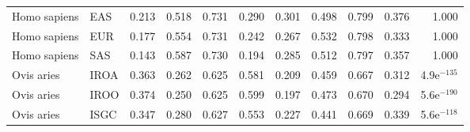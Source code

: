 \begin{center}
\begin{adjustbox}{width = 1\textwidth}
\begin{tabular}{llrrrrrrrrr}
        Homo sapiens &                       EAS &                              0.213 &                               0.518 &                 0.731 &                 0.290 &                              0.301 &                               0.498 &                 0.799 &                 0.376 &         1.000 \\
        Homo sapiens &                       EUR &                              0.177 &                               0.554 &                 0.731 &                 0.242 &                              0.267 &                               0.532 &                 0.798 &                 0.333 &         1.000 \\
        Homo sapiens &                       SAS &                              0.143 &                               0.587 &                 0.730 &                 0.194 &                              0.285 &                               0.512 &                 0.797 &                 0.357 &         1.000 \\
          Ovis aries &                      IROA &                              0.363 &                               0.262 &                 0.625 &                 0.581 &                              0.209 &                               0.459 &                 0.667 &                 0.312 & 4.9e$^{-135}$ \\
          Ovis aries &                      IROO &                              0.374 &                               0.250 &                 0.625 &                 0.599 &                              0.197 &                               0.473 &                 0.670 &                 0.294 & 5.6e$^{-190}$ \\
          Ovis aries &                      ISGC &                              0.347 &                               0.280 &                 0.627 &                 0.553 &                              0.227 &                               0.441 &                 0.669 &                 0.339 & 5.6e$^{-118}$ \\
\bottomrule
\end{tabular}
\end{adjustbox}
\end{center}
